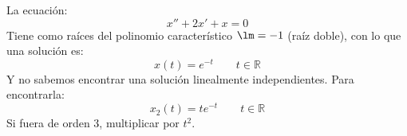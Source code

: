 \begin{ejercicio*}
    La ecuación:
    \begin{equation*}
        x'' + 2x' + x = 0
    \end{equation*}
    Tiene como raíces del polinomio característico $\lm = -1$ (raíz doble), con lo que una solución es:
    \begin{equation*}
        x(t) = e^{-t} \qquad t\in \mathbb{R}
    \end{equation*}
    Y no sabemos encontrar una solución linealmente independientes. Para encontrarla:
    \begin{equation*}
        x_2(t) = te^{-t} \qquad t\in \mathbb{R}
    \end{equation*}
    Si fuera de orden 3, multiplicar por $t^2$.
\end{ejercicio*}
